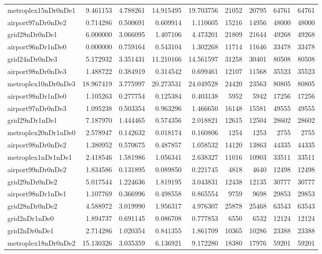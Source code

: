 \begin{longtable}{|l|r|r|r|r|r|r|r|r|}
metroplex15nDr0nDe1 & 9.461153 & 4.788261 & 14.915495 & 19.703756 & 21052 & 20795 & 64761 & 64761 \\
airport97nDr0nDe2 & 0.714286 & 0.500691 & 0.609914 & 1.110605 & 15216 & 14956 & 48000 & 48000 \\
grid28nDr0nDe1 & 6.000000 & 3.066095 & 1.407106 & 4.473201 & 21809 & 21644 & 49268 & 49268 \\
airport96nDr1nDe0 & 0.000000 & 0.759164 & 0.543104 & 1.302268 & 11714 & 11646 & 33478 & 33478 \\
grid24nDr0nDe3 & 5.172932 & 3.351431 & 11.210166 & 14.561597 & 31258 & 30401 & 80508 & 80508 \\
airport98nDr0nDe3 & 1.488722 & 0.384919 & 0.314542 & 0.699461 & 12107 & 11568 & 35523 & 35523 \\
metroplex10nDr0nDe3 & 18.967419 & 3.775997 & 20.273531 & 24.049528 & 24420 & 23563 & 80805 & 80805 \\
airport98nDr1nDe0 & 1.105263 & 0.277754 & 0.125384 & 0.403138 & 5952 & 5942 & 17256 & 17256 \\
airport97nDr0nDe3 & 1.095238 & 0.503354 & 0.963296 & 1.466650 & 16148 & 15581 & 49555 & 49555 \\
grid29nDr1nDe1 & 7.187970 & 1.444465 & 0.574356 & 2.018821 & 12615 & 12504 & 28602 & 28602 \\
metroplex20nDr1nDe0 & 2.578947 & 0.142632 & 0.018174 & 0.160806 & 1254 & 1253 & 2755 & 2755 \\
airport98nDr0nDe2 & 1.380952 & 0.570675 & 0.487857 & 1.058532 & 14120 & 13863 & 44335 & 44335 \\
metroplex1nDr1nDe1 & 2.418546 & 1.581986 & 1.056341 & 2.638327 & 11016 & 10903 & 33511 & 33511 \\
airport99nDr0nDe2 & 1.834586 & 0.131895 & 0.089850 & 0.221745 & 4818 & 4640 & 12498 & 12498 \\
grid29nDr0nDe2 & 5.017544 & 1.224636 & 1.819195 & 3.043831 & 12438 & 12135 & 30777 & 30777 \\
airport98nDr1nDe1 & 1.107769 & 0.366996 & 0.498558 & 0.865554 & 9759 & 9698 & 29853 & 29853 \\
grid28nDr0nDe2 & 4.588972 & 3.019990 & 1.956317 & 4.976307 & 25878 & 25468 & 63543 & 63543 \\
grid2nDr1nDe0 & 1.894737 & 0.691145 & 0.086708 & 0.777853 & 6550 & 6532 & 12124 & 12124 \\
grid2nDr0nDe1 & 2.714286 & 1.020354 & 0.841355 & 1.861709 & 10365 & 10286 & 23388 & 23388 \\
metroplex18nDr0nDe2 & 15.130326 & 3.035359 & 6.136921 & 9.172280 & 18380 & 17976 & 59201 & 59201 \\

\end{longtable}
